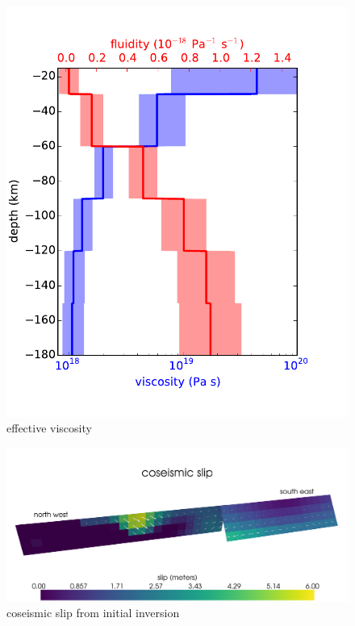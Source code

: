 \documentclass[12pt]{article}
\begin{document}
\begin{figure}
\includegraphics[scale=1.0]{Figures/effective_viscosity}
\centering 
\caption{effective viscosity}
\label{EffectiveViscosity}
\end{figure} 

\begin{figure}
\includegraphics[scale=0.1]{Figures/initial_coseismic}
\caption{coseismic slip from initial inversion}
\label{InitialCoseismic}
\end{figure} 
\end{document}
